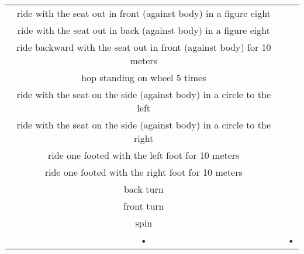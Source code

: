 \begin{tabular}{cc}
ride with the seat out in front (against body) in a figure eight\\
ride with the seat out in back (against body) in a figure eight\\
ride backward with the seat out in front (against body) for 10 meters\\
hop standing on wheel 5 times\\
ride with the seat on the side (against body) in a circle to the left\\
ride with the seat on the side (against body) in a circle to the right\\
ride one footed with the left foot for 10 meters\\
ride one footed with the right foot for 10 meters\\
back turn\\
front turn\\
spin \\
\hline 
• & • \\ 
\end{tabular} 
